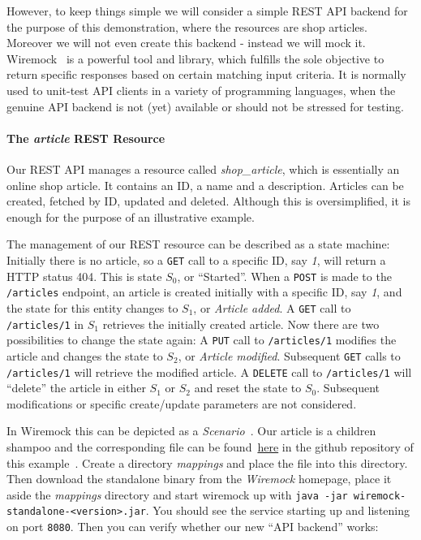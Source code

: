 \documentclass[paper=a4,11pt,numbers=noenddot]{article}
\begin{document}
However, to keep things simple we will consider a simple REST API backend for the purpose of this demonstration, where the resources are shop articles. Moreover we will not even create this backend - instead we will mock it. Wiremock~\autocite{noauthor_wiremock_nodate} is a powerful tool and library, which fulfills the sole objective to return specific responses based on certain matching input criteria. It is normally used to unit-test API clients in a variety of programming languages, when the genuine API backend is not (yet) available or should not be stressed for testing.

\paragraph{The \emph{article} REST Resource}

Our REST API manages a resource called \emph{shop\_article}, which is essentially an online shop article. It contains an ID, a name and a description. Articles can be created, fetched by ID, updated and deleted. Although this is oversimplified, it is enough for the purpose of an illustrative example.

The management of our REST resource can be described as a state machine: Initially there is no article, so a \verb'GET' call to a specific ID, say \emph{1}, will return a HTTP status 404. This is state $S_0$, or ``Started''. When a \verb'POST' is made to the \verb'/articles' endpoint, an article is created initially with a specific ID, say \emph{1}, and the state for this entity changes to $S_1$, or \emph{Article added}. A \verb'GET' call to \verb'/articles/1' in $S_1$ retrieves the initially created article. Now there are two possibilities to change the state again: A \verb'PUT' call to \verb'/articles/1' modifies the article and changes the state to $S_2$, or \emph{Article modified}. Subsequent \verb'GET' calls to \verb'/articles/1' will retrieve the modified article. A \verb'DELETE' call to \verb'/articles/1' will ``delete'' the article in either $S_1$ or $S_2$ and reset the state to $S_0$. Subsequent modifications or specific create/update parameters are not considered.

In Wiremock this can be depicted as a \emph{Scenario}~\autocite{noauthor_wiremock_stateful_behavior_2025}. Our article is a children shampoo and the corresponding file can be found~\href{https://github.com/ecky-l/terraform-provider-example/blob/main/src/wiremock/mappings/shampoo.json}{here} in the github repository of this example~\autocite{ecky-l_terraform-provider-example_nodate}. Create a directory \emph{mappings} and place the file into this directory. Then download the standalone binary from the \emph{Wiremock} homepage, place it aside the \emph{mappings} directory and start wiremock up with \verb'java -jar wiremock-standalone-<version>.jar'. You should see the service starting up and listening on port \verb'8080'. Then you can verify whether our new ``API backend'' works:
\end{document}
